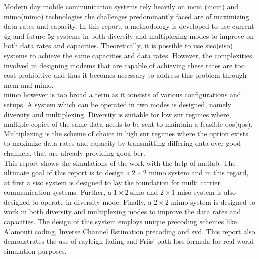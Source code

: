 \vspace{-1cm}



Modern day mobile communication systems rely heavily on \acrlong{mcm} (\acrshort{mcm}) and \acrlong{mimo}(\acrshort{mimo}) technologies the challenges predominantly faced are of maximizing data rates and capacity. In this report, a methodology is developed to use current \acrshort{4g} and future \acrshort{5g} systems in both diversity and multiplexing modes to improve on both data rates and capacities.  Theoretically, it is possible to use \acrlong{siso}(\acrshort{siso}) systems to achieve the same capacities and data rates. However, the complexities involved in designing \gls{modems} that are capable of achieving these rates are too cost prohibitive and thus it becomes necessary  to address this problem through \acrshort{mcm} and \acrshort{mimo}.\\

\acrshort{mimo} however is too broad a term as it consists of various configurations and setups. A system which can be operated in two modes is designed, namely diversity and multiplexing. Diversity is suitable for low \acrshort{snr} regimes where, multiple copies of the same data needs to be sent to maintain a feasible \acrlong{qos}(\acrshort{qos}). Multiplexing is the scheme of choice in high \acrshort{snr} regimes where the option exists to maximize data rates and capacity by transmitting differing data over good channels. that are already providing good \acrshort{ber}.\\


This report shows the simulations of the work with the help of \gls{matlab}. The ultimate goal of this report is to design a $2 \times 2$ \acrshort{mimo} system and in this regard, at first a \acrshort{siso} system is designed to lay the foundation for multi carrier communication systems. Further, a $1 \times 2$ \acrshort{simo} and $2 \times 1$ \acrshort{miso} system is also designed to operate in diversity mode. Finally, a $2 \times 2$ \acrshort{mimo} system is designed to work in both diversity and multiplexing modes to improve the data rates and capacities. The design of this system employs unique precoding schemes like Alamouti coding, Inverse Channel Estimation precoding and \acrshort{svd}. This report also demonstrates the use of \gls{rayleigh fading} and Friis' path loss formula for real world simulation purposes.

\pagebreak